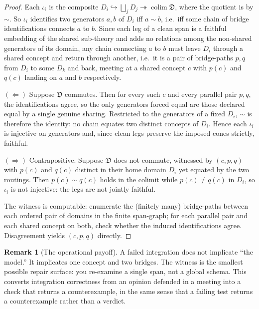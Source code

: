 \documentclass[11pt]{article}
\theoremstyle{plain}
\theoremstyle{definition}
\newtheorem{remark}{Remark}
\begin{document}
\begin{proof}
Each $\iota_i$ is the composite $D_i \hookrightarrow \bigsqcup_j D_j \twoheadrightarrow \operatorname{colim}\mathfrak{D}$, where the quotient is by $\sim$. So $\iota_i$ identifies two generators $a,b$ of $D_i$ iff $a \sim b$, i.e.\ iff some chain of bridge identifications connects $a$ to $b$. Since each leg of a clean span is a faithful embedding of the shared sub-theory and adds no relations among the non-shared generators of its domain, any chain connecting $a$ to $b$ must leave $D_i$ through a shared concept and return through another, i.e.\ it is a pair of bridge-paths $p,q$ from $D_i$ to some $D_k$ and back, meeting at a shared concept $c$ with $p(c)$ and $q(c)$ landing on $a$ and $b$ respectively.

$(\Leftarrow)$ Suppose $\mathfrak{D}$ commutes. Then for every such $c$ and every parallel pair $p,q$, the identifications agree, so the only generators forced equal are those declared equal by a single genuine sharing. Restricted to the generators of a fixed $D_i$, $\sim$ is therefore the identity: no chain equates two distinct concepts of $D_i$. Hence each $\iota_i$ is injective on generators and, since clean legs preserve the imposed cones strictly, faithful.

$(\Rightarrow)$ Contrapositive. Suppose $\mathfrak{D}$ does not commute, witnessed by $(c,p,q)$ with $p(c)$ and $q(c)$ distinct in their home domain $D_i$ yet equated by the two routings. Then $p(c) \sim q(c)$ holds in the colimit while $p(c)\neq q(c)$ in $D_i$, so $\iota_i$ is not injective: the legs are not jointly faithful.

The witness is computable: enumerate the (finitely many) bridge-paths between each ordered pair of domains in the finite span-graph; for each parallel pair and each shared concept on both, check whether the induced identifications agree. Disagreement yields $(c,p,q)$ directly.
\end{proof}

\begin{remark}[The operational payoff]
A failed integration does not implicate ``the model.'' It implicates one concept and two bridges. The witness is the smallest possible repair surface: you re-examine a single span, not a global schema. This converts integration correctness from an opinion defended in a meeting into a check that returns a counterexample, in the same sense that a failing test returns a counterexample rather than a verdict.
\end{remark}
\end{document}
